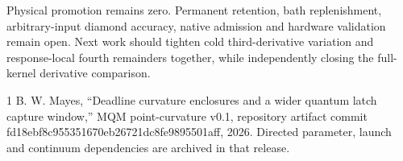 \documentclass[a4paper,journal]{IEEEtran}
\begin{document}
Physical promotion remains zero. Permanent retention, bath replenishment, arbitrary-input diamond accuracy, native admission and hardware validation remain open. Next work should tighten cold third-derivative variation and response-local fourth remainders together, while independently closing the full-kernel derivative comparison.
\begin{thebibliography}{1}
 B. W. Mayes, ``Deadline curvature enclosures and a wider quantum latch capture window,'' MQM point-curvature v0.1, repository artifact commit fd18ebf8c955351670eb26721dc8fe9895501aff, 2026. Directed parameter, launch and continuum dependencies are archived in that release.
\end{thebibliography}
\end{document}

